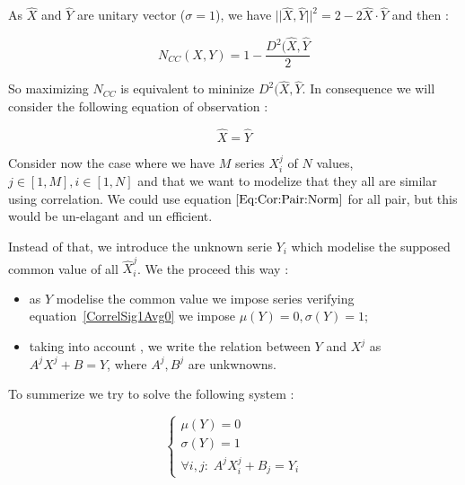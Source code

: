 As $\widehat {X}$ and $\widehat {Y}$ are unitary vector ($\sigma = 1$), we have
$||\widehat {X} ,\widehat {Y}||^2  = 2 - 2 \widehat {X} \cdot \widehat {Y} $ and then :


\begin{equation}
    N_{CC}(X,Y) = 1-\frac{ D^2(\widehat {X} ,\widehat {Y}}{2}
\end{equation}

So maximizing $N_{CC}$ is equivalent to mininize $ D^2(\widehat {X} ,\widehat {Y}$. In consequence
we will consider the following equation of observation :


\begin{equation}
    \widehat {X} =\widehat {Y} \label{Eq:Cor:Pair:Norm}
\end{equation}

Consider now the case where we have $M$ series $X^j_i$ of $N$ values, $j \in [1,M], i \in [1,N]$
and that we want to modelize that they all are similar using correlation. We could use
equation $\ref{Eq:Cor:Pair:Norm}$ for all pair, but this would be un-elagant and un efficient.

Instead of that, we introduce the unknown serie $Y_i$ which modelise the supposed common value
of all $\widehat X^j_i$. We the proceed this way :

\begin{itemize}
    \item as $Y$ modelise the common value we impose series verifying equation~\ref{CorrelSig1Avg0}
          we impose $\mu(Y)=0, \sigma(Y)=1$;
    \item taking into account \label{CorrelXXHat}, we write the relation between $Y$ and $X^j$ as
          $A^j X^j + B = Y$, where $A^j,B^j$ are unkwnowns.
\end{itemize}

To summerize we try to solve the following system :

\begin{equation}
\left\{ \begin{array}{rc|l}
     \mu(Y) = 0         \\ 
     \sigma(Y) = 1         \\ 
      \forall i,j : \;  A^j X^j_i + B_j = Y_i
\end{array}\right.
\label{XXXXX}
\end{equation}








